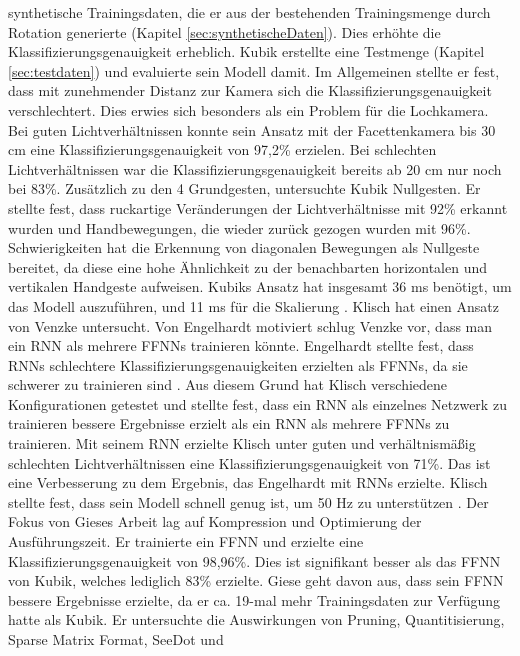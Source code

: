 synthetische Trainingsdaten, die er aus der bestehenden Trainingsmenge durch Rotation generierte (Kapitel \ref{sec:synthetischeDaten}). Dies erhöhte die Klassifizierungsgenauigkeit erheblich. Kubik erstellte eine Testmenge
(Kapitel \ref{sec:testdaten}) und evaluierte sein Modell damit. Im Allgemeinen stellte er fest, dass mit zunehmender Distanz zur Kamera sich die Klassifizierungsgenauigkeit verschlechtert. Dies erwies sich besonders als ein
Problem für die Lochkamera. Bei guten Lichtverhältnissen konnte sein Ansatz mit der Facettenkamera bis 30 cm eine Klassifizierungsgenauigkeit von 97,2\% erzielen. Bei schlechten Lichtverhältnissen war die Klassifizierungsgenauigkeit
bereits ab 20 cm nur noch bei 83\%. Zusätzlich zu den 4 Grundgesten, untersuchte Kubik Nullgesten. Er stellte fest, dass ruckartige Veränderungen der Lichtverhältnisse mit 92\% erkannt wurden und Handbewegungen, die wieder
zurück gezogen wurden mit 96\%. Schwierigkeiten hat die Erkennung von diagonalen Bewegungen als Nullgeste bereitet, da diese eine hohe Ähnlichkeit zu der benachbarten horizontalen und vertikalen Handgeste aufweisen. Kubiks Ansatz
hat insgesamt 36 ms benötigt, um das Modell auszuführen, und 11 ms für die Skalierung \cite{kubikThesis}.
\newline
\newline
Klisch hat einen Ansatz von Venzke untersucht. Von Engelhardt motiviert schlug Venzke vor, dass man ein RNN als mehrere FFNNs trainieren könnte. Engelhardt stellte fest, dass RNNs schlechtere
Klassifizierungsgenauigkeiten erzielten als FFNNs, da sie schwerer zu trainieren sind \cite{engelhardtThesis}. Aus diesem Grund hat Klisch verschiedene Konfigurationen getestet und stellte fest,
dass ein RNN als einzelnes Netzwerk zu trainieren bessere Ergebnisse erzielt als ein RNN als mehrere FFNNs zu trainieren. Mit seinem RNN erzielte Klisch unter guten und verhältnismäßig
schlechten Lichtverhältnissen eine Klassifizierungsgenauigkeit von 71\%. Das ist eine Verbesserung zu dem Ergebnis, das Engelhardt mit RNNs erzielte.
Klisch stellte fest, dass sein Modell schnell genug ist, um 50 Hz zu unterstützen \cite{klischThesis}.
\newline
\newline
Der Fokus von Gieses Arbeit lag auf Kompression und Optimierung der Ausführungszeit. Er trainierte ein FFNN und erzielte eine Klassifizierungsgenauigkeit von 98,96\%. Dies ist signifikant besser als das FFNN von Kubik, welches lediglich 83\% erzielte.
Giese geht davon aus, dass sein FFNN bessere Ergebnisse erzielte, da er ca. 19-mal mehr Trainingsdaten zur Verfügung hatte als Kubik. Er untersuchte die Auswirkungen von Pruning, Quantitisierung, Sparse Matrix Format, SeeDot und
